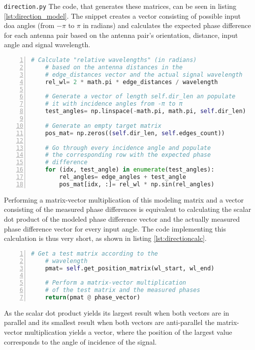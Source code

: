 \begin{subchapter}{\texttt{direction.py}}
  The code, that generates these matrices, can be seen in
  listing \ref{lst:direction_model}.
  The snippet creates a vector consisting of possible input
  \acrlong{doa} angles (from $-\pi$ to $\pi$ in radians)
  and calculates the expected phase difference for each
  antenna pair based on the antenna pair's orientation,
  distance, input angle and signal wavelength.

  \begin{lstlisting}[language=Python, frame=single,
      numbers=left, label={lst:direction_model},
      caption={Code fragment that calculates the receiver model}]
    # Calculate "relative wavelengths" (in radians)
    # based on the antenna distances in the
    # edge_distances vector and the actual signal wavelength
    rel_wl= 2 * math.pi * edge_distances / wavelength

    # Generate a vector of length self.dir_len an populate
    # it with incidence angles from -π to π
    test_angles= np.linspace(-math.pi, math.pi, self.dir_len)

    # Generate an empty target matrix
    pos_mat= np.zeros((self.dir_len, self.edges_count))

    # Go through every incidence angle and populate
    # the corresponding row with the expected phase
    # difference
    for (idx, test_angle) in enumerate(test_angles):
        rel_angles= edge_angles + test_angle
        pos_mat[idx, :]= rel_wl * np.sin(rel_angles)
  \end{lstlisting}

  Performing a matrix-vector multiplication of this modeling matrix
  and a vector consisting of the measured phase differences
  is equivalent to calculating the scalar dot product of the
  modeled phase difference vector and the actually measured
  phase difference vector for every input angle.
  The code implementing this calculation is
  thus very short, as shown in listing \ref{lst:directioncalc}. \\

  \begin{lstlisting}[language=Python, frame=single,
      numbers=left, label={lst:directioncalc},
      caption={Code fragment that calculates the \gls{doa} estimation}]
    # Get a test matrix according to the
    # wavelength
    pmat= self.get_position_matrix(wl_start, wl_end)

    # Perform a matrix-vector multiplication
    # of the test matrix and the measured phases
    return(pmat @ phase_vector)
  \end{lstlisting}

  As the scalar dot product yields its largest result
  when both vectors are in parallel and its smallest
  result when both vectors are anti-parallel the
  matrix-vector multiplication yields a vector, where
  the position of the largest value corresponds to the
  angle of incidence of the signal.
\end{subchapter}

